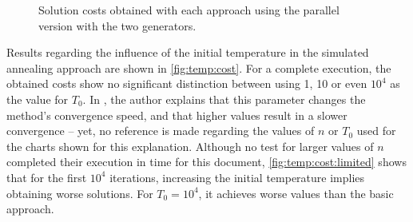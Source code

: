 \begin{figure}[!htp]
	\hfill
	\caption[Parallel solution costs]{Solution costs obtained with each approach using the parallel version with the two generators.}
	\label{fig:mpi}
\end{figure}

Results regarding the influence of the initial temperature in the simulated annealing approach are shown in \cref{fig:temp:cost}. For a complete execution, the obtained costs show no significant distinction between using 1, 10 or even $10^{4}$ as the value for $T_{0}$. In \cite{Quinn2004}, the author explains that this parameter changes the method's convergence speed, and that higher values result in a slower convergence -- yet, no reference is made regarding the values of $n$ or $T_{0}$ used for the charts shown for this explanation. Although no test for larger values of $n$ completed their execution in time for this document, \cref{fig:temp:cost:limited} shows that for the first $10^{4}$ iterations, increasing the initial temperature implies obtaining worse solutions. For $T_{0}=10^{4}$, it achieves worse values than the basic approach.

